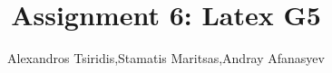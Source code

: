 \documentclass[11pt]{article}
\title{Assignment 6: Latex G5}
\author{Alexandros Tsiridis,Stamatis Maritsas,Andray Afanasyev}
\date{}
\begin{document}
\maketitle

\nocite{*}



\end{document}
